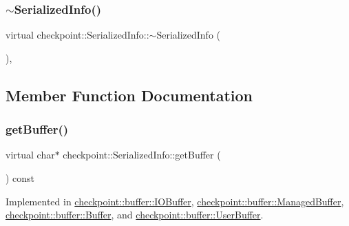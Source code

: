 \subsubsection{\texorpdfstring{$\sim$\+Serialized\+Info()}{~SerializedInfo()}}
{\footnotesize\ttfamily virtual checkpoint\+::\+Serialized\+Info\+::$\sim$\+Serialized\+Info (\begin{DoxyParamCaption}{ }\end{DoxyParamCaption})\hspace{0.3cm}{\ttfamily [inline]}, {\ttfamily [virtual]}}



\subsection{Member Function Documentation}
\mbox{\label{structcheckpoint_1_1_serialized_info_aa941e773b665a69a856996d243e7f2c7}} 
\subsubsection{\texorpdfstring{get\+Buffer()}{getBuffer()}}
{\footnotesize\ttfamily virtual char$\ast$ checkpoint\+::\+Serialized\+Info\+::get\+Buffer (\begin{DoxyParamCaption}{ }\end{DoxyParamCaption}) const\hspace{0.3cm}{\ttfamily [pure virtual]}}



Implemented in \hyperlink{structcheckpoint_1_1buffer_1_1_i_o_buffer_ac0ff5457dbbec216ce8620ad25e283fa}{checkpoint\+::buffer\+::\+I\+O\+Buffer}, \hyperlink{structcheckpoint_1_1buffer_1_1_managed_buffer_a9a44d0c4e088ac080f13c84072a86e91}{checkpoint\+::buffer\+::\+Managed\+Buffer}, \hyperlink{structcheckpoint_1_1buffer_1_1_buffer_ad6a6457df5d7020cd3622d353eb8394b}{checkpoint\+::buffer\+::\+Buffer}, and \hyperlink{structcheckpoint_1_1buffer_1_1_user_buffer_a1a71a6378472d56c8c17f01dd44462b7}{checkpoint\+::buffer\+::\+User\+Buffer}.

\mbox{\label{structcheckpoint_1_1_serialized_info_a7550340904d20dd612100fb37d1d4452}} 
